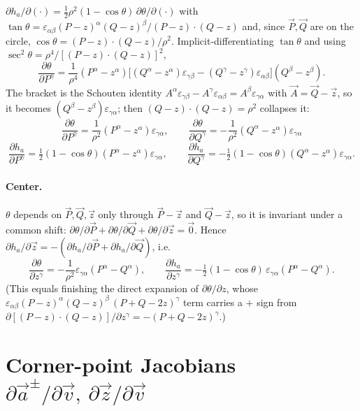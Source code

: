 \documentclass[11pt]{article}
\newcommand{\vv}[1]{\vec{#1}}
\newcommand{\half}{\tfrac{1}{2}}
\begin{document}
$\partial h_a/\partial(\cdot)=\half\rho^2(1-\cos\theta)\,\partial\theta/\partial(\cdot)$ with
$\tan\theta=\varepsilon_{\alpha\beta}(P-z)^{\alpha}(Q-z)^{\beta}\big/(P-z)\!\cdot\!(Q-z)$ and, since
$\vv P,\vv Q$ are on the circle, $\cos\theta=(P-z)\!\cdot\!(Q-z)/\rho^2$. Implicit-differentiating
$\tan\theta$ and using $\sec^2\theta=\rho^4/[(P-z)\!\cdot\!(Q-z)]^2$,
\[
  \frac{\partial\theta}{\partial P^{\gamma}}=\frac{1}{\rho^4}
  (P^{\alpha}-z^{\alpha})\Big[(Q^{\alpha}-z^{\alpha})\varepsilon_{\gamma\beta}
  -(Q^{\gamma}-z^{\gamma})\varepsilon_{\alpha\beta}\Big](Q^{\beta}-z^{\beta}).
\]
The bracket is the Schouten identity $A^{\alpha}\varepsilon_{\gamma\beta}-A^{\gamma}\varepsilon_{\alpha\beta}
=A^{\beta}\varepsilon_{\gamma\alpha}$ with $\vv A=\vv Q-\vv z$, so it becomes
$(Q^{\beta}-z^{\beta})\varepsilon_{\gamma\alpha}$; then $(Q-z)\!\cdot\!(Q-z)=\rho^2$ collapses it:
\[
  \boxed{\ \frac{\partial\theta}{\partial P^{\gamma}}=\frac{1}{\rho^2}(P^{\alpha}-z^{\alpha})\varepsilon_{\gamma\alpha},
  \qquad
  \frac{\partial\theta}{\partial Q^{\gamma}}=-\frac{1}{\rho^2}(Q^{\alpha}-z^{\alpha})\varepsilon_{\gamma\alpha}\ }
\]
\[
  \frac{\partial h_a}{\partial P^{\gamma}}=\half(1-\cos\theta)(P^{\alpha}-z^{\alpha})\varepsilon_{\gamma\alpha},
  \qquad
  \frac{\partial h_a}{\partial Q^{\gamma}}=-\half(1-\cos\theta)(Q^{\alpha}-z^{\alpha})\varepsilon_{\gamma\alpha}.
\]

\paragraph{Center.} $\theta$ depends on $\vv P,\vv Q,\vv z$ only through $\vv P-\vv z$ and $\vv
Q-\vv z$, so it is invariant under a common shift: $\partial\theta/\partial\vv P+\partial\theta/\partial\vv
Q+\partial\theta/\partial\vv z=\vv0$. Hence $\partial h_a/\partial\vv z=-(\partial h_a/\partial\vv
P+\partial h_a/\partial\vv Q)$, i.e.
\[
  \boxed{\ \frac{\partial\theta}{\partial z^{\gamma}}=-\frac{1}{\rho^2}\varepsilon_{\gamma\alpha}(P^{\alpha}-Q^{\alpha}),
  \qquad
  \frac{\partial h_a}{\partial z^{\gamma}}=-\half(1-\cos\theta)\,\varepsilon_{\gamma\alpha}(P^{\alpha}-Q^{\alpha}).\ }
\]
(This equals finishing the direct expansion of $\partial\theta/\partial z$, whose
$\varepsilon_{\alpha\beta}(P-z)^{\alpha}(Q-z)^{\beta}\,(P+Q-2z)^{\gamma}$ term carries a $+$ sign from
$\partial[(P-z)\!\cdot\!(Q-z)]/\partial z^{\gamma}=-(P+Q-2z)^{\gamma}$.)

\section{Corner-point Jacobians $\partial\vv a^{\pm}/\partial\vv v,\ \partial\vv z/\partial\vv v$}
\end{document}
